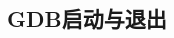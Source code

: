 \documentclass[class=book, crop=false]{standalone}
\begin{document}
\begin{CJK}{UTF8}{gbsn}

\chapter{GDB启动与退出}









\cleardoublepage

\end{CJK}
\end{document}
